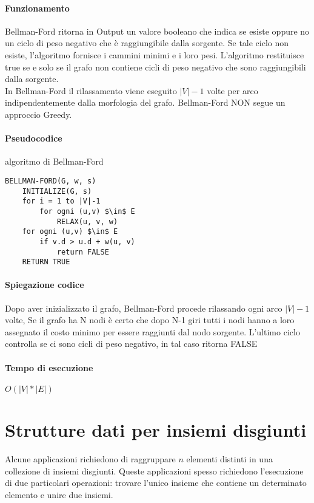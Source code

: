 \documentclass[12pt, a4paper, openany]{book}
\begin{document}
	\paragraph{Funzionamento}
	Bellman-Ford ritorna in Output un valore booleano che indica se esiste oppure no un ciclo di peso
	negativo che è raggiungibile dalla sorgente. Se tale ciclo non esiste, l'algoritmo fornisce i cammini minimi
	e i loro pesi. L'algoritmo restituisce true se e solo se il grafo non contiene cicli di peso negativo che sono
	raggiungibili dalla sorgente.\\
	In Bellman-Ford il rilassamento viene eseguito $|V|-1$ volte per arco indipendentemente dalla morfologia del grafo.
	Bellman-Ford NON segue un approccio Greedy.

	\paragraph{Pseudocodice} algoritmo di Bellman-Ford
	\begin{lstlisting}
BELLMAN-FORD(G, w, s)
    INITIALIZE(G, s)
    for i = 1 to |V|-1
        for ogni (u,v) $\in$ E
            RELAX(u, v, w)
    for ogni (u,v) $\in$ E
        if v.d > u.d + w(u, v)
            return FALSE
    RETURN TRUE
\end{lstlisting}

	\paragraph{Spiegazione codice}
	Dopo aver inizializzato il grafo, Bellman-Ford procede rilassando ogni arco $|V|-1$ volte,
	Se il grafo ha N nodi è certo che dopo N-1 giri tutti i nodi hanno a loro assegnato il costo minimo per essere raggiunti dal nodo sorgente.
	L'ultimo ciclo controlla se ci sono cicli di peso negativo, in tal caso ritorna FALSE

	\paragraph{Tempo di esecuzione}
	\begin{center}
		$O(|V|*|E|)$
	\end{center}

	\section{Strutture dati per insiemi disgiunti}
	Alcune applicazioni richiedono di raggruppare $n$ elementi distinti in una collezione di insiemi disgiunti.
	Queste applicazioni spesso richiedono l'esecuzione di due particolari operazioni: trovare l'unico insieme che contiene un determinato elemento e unire due insiemi.
\end{document}
